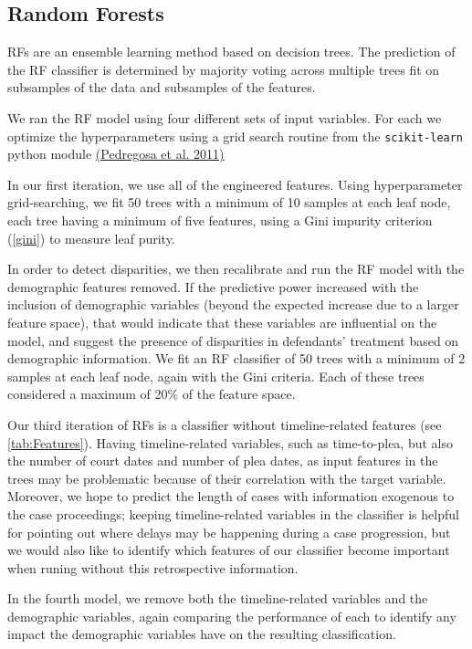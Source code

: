 \subsection{Random Forests}\label{rf} 
RFs are an ensemble learning method based on decision trees. The
prediction of the RF classifier is determined by majority voting
across multiple trees fit on subsamples of the data and subsamples of
the features.

We ran the RF model using four different sets of input variables. For
each we optimize the hyperparameters using a grid search routine from
the {\tt scikit-learn} python module \hyperref[csl:17]{(Pedregosa et
  al. 2011)}

In our first iteration, we use all of the engineered features. Using
hyperparameter grid-searching, we fit 50 trees with a minimum of 10
samples at each leaf node, each tree having a minimum of five
features, using a Gini impurity criterion (\autoref{gini}) to measure
leaf purity.

In order to detect disparities, we then recalibrate and run the RF
model with the demographic features removed. If the predictive power
increased with the inclusion of demographic variables (beyond the
expected increase due to a larger feature space), that would indicate
that these variables are influential on the model, and suggest the
presence of disparities in defendants' treatment based on demographic
information. We fit an RF classifier of 50 trees with a minimum of 2
samples at each leaf node, again with the Gini criteria. Each of these
trees considered a maximum of 20\% of the feature space.

Our third iteration of RFs is a classifier without timeline-related
features (see \autoref{tab:Features}). Having timeline-related
variables, such as time-to-plea, but also the number of court dates and
number of plea dates, as input features in the trees may be
problematic because of their correlation with the target
variable. Moreover, we hope to predict the length of cases with
information exogenous to the case proceedings; keeping
timeline-related variables in the classifier is helpful for pointing
out where delays may be happening during a case progression, but we
would also like to identify which features of our classifier become
important when runing without this retrospective information.

In the fourth model, we remove both the timeline-related variables and the
demographic variables, again comparing the performance of each to
identify any impact the demographic variables have on the resulting
classification.

